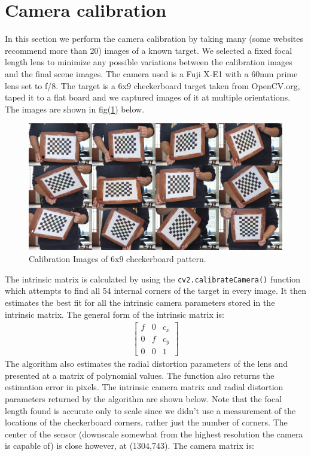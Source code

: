 \documentclass[a4paper]{article}
\begin{document}
\section{Camera calibration}
In this section we perform the camera calibration by taking many (some websites recommend more than 20) images of a known target.  We selected a fixed focal length lens to minimize any possible variations between the calibration images and the final scene images. The camera used is a Fuji X-E1 with a 60mm prime lens set to f/8.  The target is a 6x9 checkerboard target taken from OpenCV.org, taped it to a flat board and we captured images of it at multiple orientations.  The images are shown in fig(\ref{fig:chkbd}) below.
 \begin{figure}[htb!]
    \includegraphics[width=\textwidth]{../CamCal}
    \caption{Calibration Images of 6x9 checkerboard pattern.}
    \label{fig:chkbd}
\end{figure}
\FloatBarrier
The intrinsic matrix is calculated by using the \verb|cv2.calibrateCamera()| function which attempts to find all 54 internal corners of the target in every image.  It then estimates the best fit for all the intrinsic camera parameters stored in the intrinsic matrix.  The general form of the intrinsic matrix is:
\begin{align*}
	\begin{bmatrix}
		f & 0 & c_x\\
		0 & f & c_y\\
		0 & 0 & 1
	\end{bmatrix}
\end{align*}
The algorithm also estimates the radial distortion parameters of the lens and presented at a matrix of polynomial values.  The function also returns the estimation error in pixels.  The  intrinsic camera matrix and radial distortion parameters returned by the algorithm are shown below.  Note that the focal length found is accurate only to scale since we didn't use a measurement of the locations of the checkerboard corners, rather just the number of corners. The center of the sensor (downscale somewhat from the highest resolution the camera is capable of) is close however, at (1304,743). The camera matrix is:
\end{document}
